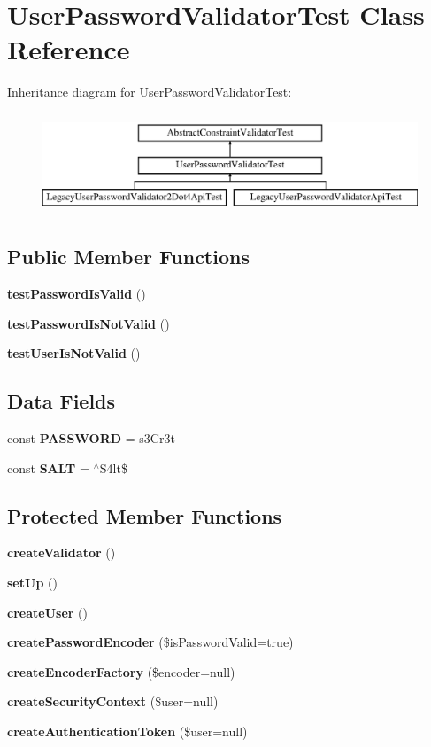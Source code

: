 \section{User\+Password\+Validator\+Test Class Reference}
\label{class_symfony_1_1_component_1_1_security_1_1_core_1_1_tests_1_1_validator_1_1_constraints_1_1_user_password_validator_test}
Inheritance diagram for User\+Password\+Validator\+Test\+:\begin{figure}[H]
\begin{center}
\leavevmode
\includegraphics[height=3.000000cm]{class_symfony_1_1_component_1_1_security_1_1_core_1_1_tests_1_1_validator_1_1_constraints_1_1_user_password_validator_test}
\end{center}
\end{figure}
\subsection*{Public Member Functions}
\begin{DoxyCompactItemize}
\item 
{\bf test\+Password\+Is\+Valid} ()
\item 
{\bf test\+Password\+Is\+Not\+Valid} ()
\item 
{\bf test\+User\+Is\+Not\+Valid} ()
\end{DoxyCompactItemize}
\subsection*{Data Fields}
\begin{DoxyCompactItemize}
\item 
const {\bf P\+A\+S\+S\+W\+O\+R\+D} = \textquotesingle{}s3\+Cr3t\textquotesingle{}
\item 
const {\bf S\+A\+L\+T} = \textquotesingle{}$^\wedge$S4lt\$\textquotesingle{}
\end{DoxyCompactItemize}
\subsection*{Protected Member Functions}
\begin{DoxyCompactItemize}
\item 
{\bf create\+Validator} ()
\item 
{\bf set\+Up} ()
\item 
{\bf create\+User} ()
\item 
{\bf create\+Password\+Encoder} (\$is\+Password\+Valid=true)
\item 
{\bf create\+Encoder\+Factory} (\$encoder=null)
\item 
{\bf create\+Security\+Context} (\$user=null)
\item 
{\bf create\+Authentication\+Token} (\$user=null)
\end{DoxyCompactItemize}
